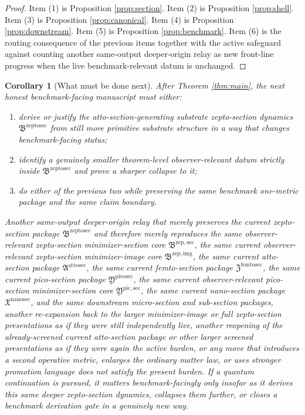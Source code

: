 \documentclass[11pt]{article}
\newcommand{\NanoSectionPackage}{\mathfrak X^{\mathrm{nanosec}}}
\newcommand{\PicoSectionPackage}{\mathfrak Y^{\mathrm{picosec}}}
\newcommand{\PicoMinSectionCore}{\mathfrak Y^{\mathrm{pic,sec}}}
\newcommand{\FemtoSectionPackage}{\mathfrak Z^{\mathrm{femtosec}}}
\newcommand{\AttoSectionPackage}{\mathfrak A^{\mathrm{attosec}}}
\newcommand{\ZeptoSectionPackage}{\mathfrak B^{\mathrm{zeptosec}}}
\newcommand{\ZeptoImageCore}{\mathfrak B^{\mathrm{zep,img}}}
\newcommand{\ZeptoMinSectionCore}{\mathfrak B^{\mathrm{zep,sec}}}
\newtheorem{corollary}{Corollary}
\begin{document}
\begin{proof}
Item (1) is Proposition \ref{prop:section}. Item (2) is Proposition \ref{prop:shell}. Item (3) is Proposition \ref{prop:canonical}. Item (4) is Proposition \ref{prop:downstream}. Item (5) is Proposition \ref{prop:benchmark}. Item (6) is the routing consequence of the previous items together with the active safeguard against counting another same-output deeper-origin relay as new front-line progress when the live benchmark-relevant datum is unchanged.
\end{proof}

\begin{corollary}[What must be done next]
\label{cor:next}
After Theorem \ref{thm:main}, the next honest benchmark-facing manuscript must either:
\begin{enumerate}
    \item derive or justify the atto-section-generating substrate zepto-section dynamics \(\ZeptoSectionPackage\) from still more primitive substrate structure in a way that changes benchmark-facing status;
    \item identify a genuinely smaller theorem-level observer-relevant datum strictly inside \(\ZeptoSectionPackage\) and prove a sharper collapse to it;
    \item do either of the previous two while preserving the same benchmark one-metric package and the same claim boundary.
\end{enumerate}
Another same-output deeper-origin relay that merely preserves the current zepto-section package \(\ZeptoSectionPackage\) and therefore merely reproduces the same observer-relevant zepto-section minimizer-section core \(\ZeptoMinSectionCore\), the same current observer-relevant zepto-section minimizer-image core \(\ZeptoImageCore\), the same current atto-section package \(\AttoSectionPackage\), the same current femto-section package \(\FemtoSectionPackage\), the same current pico-section package \(\PicoSectionPackage\), the same current observer-relevant pico-section minimizer-section core \(\PicoMinSectionCore\), the same current nano-section package \(\NanoSectionPackage\), and the same downstream micro-section and sub-section packages, another re-expansion back to the larger minimizer-image or full zepto-section presentations as if they were still independently live, another reopening of the already-screened current atto-section package or other larger screened presentations as if they were again the active burden, or any move that introduces a second operative metric, enlarges the ordinary matter law, or uses stronger promotion language does not satisfy the present burden. If a quantum continuation is pursued, it matters benchmark-facingly only insofar as it derives this same deeper zepto-section dynamics, collapses them further, or closes a benchmark derivation gate in a genuinely new way.
\end{corollary}
\end{document}
